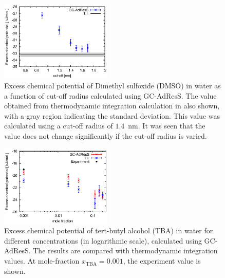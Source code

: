 \documentclass[a4paper,preprint,unsortedaddress]{revtex4-1}
\newcommand{\concenttba}{x_{\textrm{TBA}}}
\begin{document}
\begin{figure}
\center
\includegraphics[width=0.475\textwidth]{convergence.eps}
\caption{ {Excess chemical potential of Dimethyl sulfoxide (DMSO) in water as a function of cut-off radius calculated using GC-AdResS. The value obtained from thermodynamic integration calculation in also shown, with a gray region indicating the standard deviation. This value was calculated using a cut-off radius of $1.4$~nm. It was seen that the value does not change significantly if the cut-off radius is varied.}}
\label{convergence}
\end{figure}

\begin{figure}
\center
\includegraphics[width=0.475\textwidth]{concentration.eps}
\caption{ {Excess chemical potential of tert-butyl alcohol (TBA) in water for different concentrations (in logarithmic scale), calculated using GC-AdResS. The results are compared with thermodynamic integration values. At mole-fraction $\concenttba=0.001$, the experiment value is shown. \label{concentration}}}
\end{figure}
\end{document}
